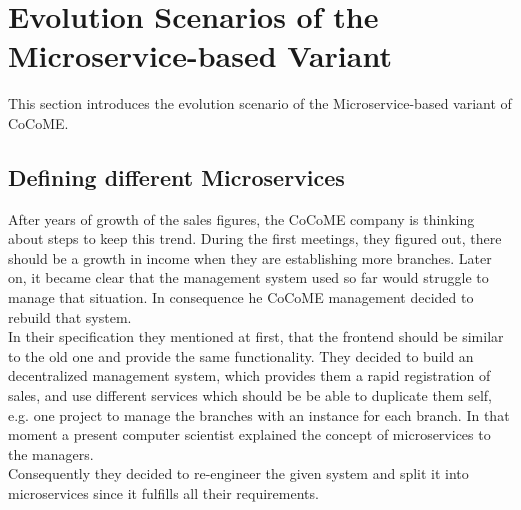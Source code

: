 
\section{Evolution Scenarios of the Microservice-based Variant}
This section introduces the evolution scenario of the Microservice-based variant of
CoCoME.
\subsection{Defining different Microservices}
After years of growth of the sales figures, the CoCoME company is thinking about steps to keep this trend. During the first meetings, they figured out, there should be a growth in income when they are establishing more branches. Later on, it became clear that the management system used so far would struggle to manage that situation. In consequence he CoCoME management decided to rebuild that system.\\
In their specification they mentioned at first, that the frontend should be similar to the old one and provide the same functionality. They decided to build an decentralized management system, which provides them a rapid registration of sales, and use different services which should be be able to duplicate them self, e.g. one project to manage the branches with an instance for each branch. In that moment a present computer scientist explained the concept of microservices to the managers.\\
Consequently they decided to re-engineer the given system and split it into microservices since it fulfills all their requirements. 

	
	
